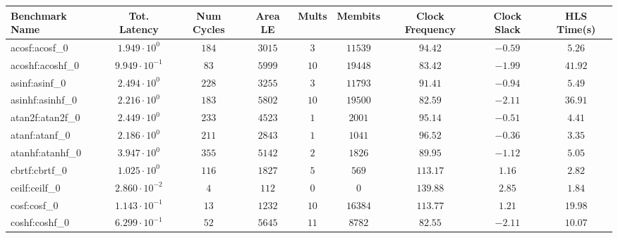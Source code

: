 \begin{tabular}{|l|c|c|c|c|c|c|c|c|}
\hline
Benchmark Name               & Tot. Latency            & Num Cycles & Area LE   & Mults   & Membits    & Clock Frequency & Clock Slack & HLS Time(s) \\
\hline
acosf:acosf\_0               & $ 1.949 \cdot 10^{0}  $ & $ 184    $ & $ 3015  $ & $ 3   $ & $ 11539  $ & $ 94.42       $ & $ -0.59   $ & $ 5.26    $ \\
acoshf:acoshf\_0             & $ 9.949 \cdot 10^{-1} $ & $ 83     $ & $ 5999  $ & $ 10  $ & $ 19448  $ & $ 83.42       $ & $ -1.99   $ & $ 41.92   $ \\
asinf:asinf\_0               & $ 2.494 \cdot 10^{0}  $ & $ 228    $ & $ 3255  $ & $ 3   $ & $ 11793  $ & $ 91.41       $ & $ -0.94   $ & $ 5.49    $ \\
asinhf:asinhf\_0             & $ 2.216 \cdot 10^{0}  $ & $ 183    $ & $ 5802  $ & $ 10  $ & $ 19500  $ & $ 82.59       $ & $ -2.11   $ & $ 36.91   $ \\
atan2f:atan2f\_0             & $ 2.449 \cdot 10^{0}  $ & $ 233    $ & $ 4523  $ & $ 1   $ & $ 2001   $ & $ 95.14       $ & $ -0.51   $ & $ 4.41    $ \\
atanf:atanf\_0               & $ 2.186 \cdot 10^{0}  $ & $ 211    $ & $ 2843  $ & $ 1   $ & $ 1041   $ & $ 96.52       $ & $ -0.36   $ & $ 3.35    $ \\
atanhf:atanhf\_0             & $ 3.947 \cdot 10^{0}  $ & $ 355    $ & $ 5142  $ & $ 2   $ & $ 1826   $ & $ 89.95       $ & $ -1.12   $ & $ 5.05    $ \\
cbrtf:cbrtf\_0               & $ 1.025 \cdot 10^{0}  $ & $ 116    $ & $ 1827  $ & $ 5   $ & $ 569    $ & $ 113.17      $ & $ 1.16    $ & $ 2.82    $ \\
ceilf:ceilf\_0               & $ 2.860 \cdot 10^{-2} $ & $ 4      $ & $ 112   $ & $ 0   $ & $ 0      $ & $ 139.88      $ & $ 2.85    $ & $ 1.84    $ \\
cosf:cosf\_0                 & $ 1.143 \cdot 10^{-1} $ & $ 13     $ & $ 1232  $ & $ 10  $ & $ 16384  $ & $ 113.77      $ & $ 1.21    $ & $ 19.98   $ \\
coshf:coshf\_0               & $ 6.299 \cdot 10^{-1} $ & $ 52     $ & $ 5645  $ & $ 11  $ & $ 8782   $ & $ 82.55       $ & $ -2.11   $ & $ 10.07   $ \\

\end{tabular}
